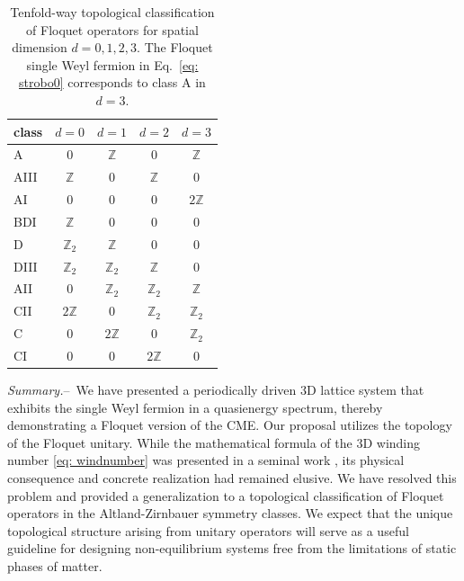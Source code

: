 \documentclass[
floatfix,
pra,
twocolumn,
reprint,
amsmath,amssymb,
aps,
footnote,
]{revtex4}
\begin{document}
\begin{center}
\begin{table}
\caption{Tenfold-way topological classification of Floquet operators for spatial dimension $d = 0,1,2,3$. The Floquet single Weyl fermion in Eq.~\eqref{eq: strobo0} corresponds to class A in $d=3$.}
\label{tab_AZ_maintext}
\begin{ruledtabular}
\begin{tabular}{lcccc}
class & $d=0$ & $d=1$ & $d=2$ & $d=3$ \\ \hline
A & $0$ & $\mathbb{Z}$ & $0$ & $\mathbb{Z}$ \\
AIII & $\mathbb{Z}$ & $0$ & $\mathbb{Z}$ & $0$ \\ \hline
AI & $0$ & $0$ & $0$ & $2\mathbb{Z}$ \\
BDI & $\mathbb{Z}$ & $0$ & $0$ & $0$ \\
D & $\mathbb{Z}_2$ & $\mathbb{Z}$ & $0$ & $0$ \\
DIII & $\mathbb{Z}_2$ & $\mathbb{Z}_2$ & $\mathbb{Z}$ & $0$ \\
AII & $0$ & $\mathbb{Z}_2$ & $\mathbb{Z}_2$ & $\mathbb{Z}$ \\
CII & $2\mathbb{Z}$ & $0$ & $\mathbb{Z}_2$ & $\mathbb{Z}_2$ \\
C & $0$ & $2\mathbb{Z}$ & $0$ & $\mathbb{Z}_2$ \\
CI & $0$ & $0$ & $2\mathbb{Z}$ & $0$ \\
\end{tabular}
\end{ruledtabular}
\end{table}
\end{center}



\textit{Summary.}--\
We have presented a periodically driven 3D lattice system that exhibits the single Weyl fermion in a quasienergy spectrum, thereby demonstrating a Floquet version of the CME.
Our proposal utilizes the topology of the Floquet unitary.
While the mathematical formula of the 3D winding number \eqref{eq: windnumber} was presented in a seminal work \cite{Kitagawa10}, its physical consequence and concrete realization had remained elusive.
We have resolved this problem and provided a generalization to a topological classification of Floquet operators in the Altland-Zirnbauer symmetry classes.
We expect that the unique topological structure arising from unitary operators will serve as a useful guideline for designing non-equilibrium systems free from the limitations of static phases of matter.
\end{document}
